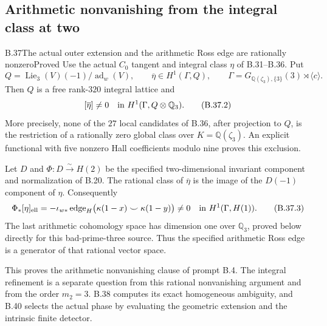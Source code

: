 \subsection{Arithmetic nonvanishing from the integral class at two}

\begin{statement}{B.37}{The actual outer extension and the arithmetic Ross edge are rationally nonzero}{Proved}
Use the actual $C_0$ tangent and integral class $\eta$ of
B.31--B.36. Put
\[
 Q=\operatorname{Lie}_3(V)(-1)/\operatorname{ad}_w(V),
 \qquad \overline\eta\in H^1(\Gamma,Q),
 \qquad
 \Gamma=G_{\mathbb Q(\zeta_3),\{3\}}(3)\rtimes\langle c\rangle.
                                                               \tag{B.37.1}
\]
Then $Q$ is a free rank-$320$ integral lattice and
\[
       [\overline\eta]\ne0
          \quad\hbox{in }H^1(\Gamma,Q\otimes\mathbb Q_3).
                                                               \tag{B.37.2}
\]
More precisely, none of the $27$ local candidates of B.36,
after projection to $Q$, is the restriction of a rationally
zero global class over $K=\mathbb Q(\zeta_3)$.
An explicit functional with five nonzero Hall coefficients
modulo nine proves this exclusion.

Let $D$ and $\Phi:D\xrightarrow{\sim}H(2)$ be the
specified two-dimensional invariant component and
normalization of B.20. The rational class of $\overline\eta$
is the image of the $D(-1)$ component of $\eta$.
Consequently
\[
 \Phi_*[\eta]_{\rm ell}
    =-\iota_{w*}\operatorname{edge}_H
                 \bigl(\kappa(1-x)\smile\kappa(1-y)\bigr)
       \ne0\quad\hbox{in }H^1(\Gamma,H(1)).                  \tag{B.37.3}
\]
The last arithmetic cohomology space has dimension one
over $\mathbb Q_3$, proved below directly for this
bad-prime-three source. Thus the specified arithmetic
Ross edge is a generator of that rational vector space.

This proves the arithmetic nonvanishing clause of prompt
B.4. The integral refinement is a separate question from
this rational nonvanishing argument and from the order
$m_2=3$. B.38 computes its exact homogeneous ambiguity,
and B.40 selects the actual phase by evaluating the
geometric extension and the intrinsic finite detector.
\end{statement}
